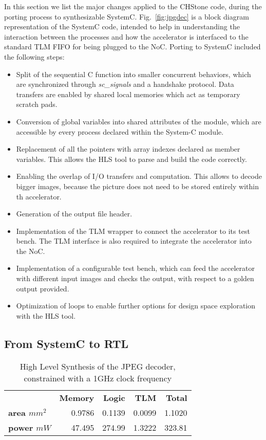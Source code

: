 \documentclass{acm_proc_article-sp}
\begin{document}
In this section we list the major changes applied to the CHStone code, during the 
porting process to synthesizable SystemC.
Fig.~\ref{fig:jpgdec} is a block diagram representation of the SystemC code, intended
to help in understanding the interaction between the processes and how the accelerator is
interfaced to the standard TLM FIFO for being plugged to the NoC.
Porting to SystemC included the following steps:
\begin{itemize}
 \item Split of the sequential C function into smaller concurrent behaviors, which
are synchronized through \emph{sc\_signals} and a handshake protocol.
Data transfers are enabled by shared local memories which act as temporary scratch pads.
 \item Conversion of global variables into shared attributes of the module,
which are accessible by every process declared within the System-C module.
 \item Replacement of all the pointers with array indexes declared as member variables.
This allows the HLS tool to parse and build the code correctly.
 \item Enabling the overlap of I/O transfers and computation. This allows to decode bigger
images, because the picture does not need to be stored entirely within th accelerator.
 \item Generation of the output file header.
 \item Implementation of the TLM wrapper to connect the accelerator to its test
bench. The TLM interface is also required to integrate the accelerator into the
NoC.
 \item Implementation of a configurable test bench, which can feed the
accelerator with different input images and checks the output, with respect to a
golden output provided.
 \item Optimization of loops to enable further options for design space
exploration with the HLS tool.
\end{itemize}

\subsection{From SystemC to RTL}

\begin{table}[b]
\centering
\begin{tabular}{|l|rrrr|}
\hline
 & \textbf{Memory} & \textbf{Logic} & \textbf{TLM} & \textbf{Total} \\
\textbf{area $mm^{2}$} & 0.9786 & 0.1139 & 0.0099 & 1.1020 \\ 
\textbf{power $mW$}    & 47.495 & 274.99 & 1.3222 & 323.81 \\
\hline
\end{tabular}
\caption{\footnotesize High Level Synthesis of the JPEG decoder, constrained with a 1GHz clock frequency}
\label{tab:rc}
\end{table}
\end{document}
